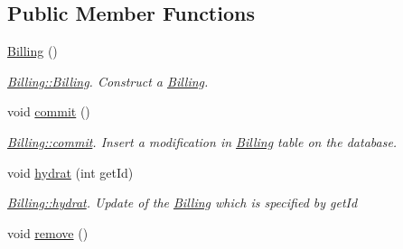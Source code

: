 \subsection*{Public Member Functions}
\begin{DoxyCompactItemize}
\item 
\hypertarget{classBilling_a8e7a38f9ef550c20ce1bf6b46153defa}{\hyperlink{classBilling_a8e7a38f9ef550c20ce1bf6b46153defa}{Billing} ()}\label{classBilling_a8e7a38f9ef550c20ce1bf6b46153defa}

\begin{DoxyCompactList}\small\item\em \hyperlink{classBilling_a8e7a38f9ef550c20ce1bf6b46153defa}{Billing\-::\-Billing}. Construct a \hyperlink{classBilling}{Billing}. \end{DoxyCompactList}\item 
\hypertarget{classBilling_a3d96a6baed6ca2d2e1096496f0fd3270}{void \hyperlink{classBilling_a3d96a6baed6ca2d2e1096496f0fd3270}{commit} ()}\label{classBilling_a3d96a6baed6ca2d2e1096496f0fd3270}

\begin{DoxyCompactList}\small\item\em \hyperlink{classBilling_a3d96a6baed6ca2d2e1096496f0fd3270}{Billing\-::commit}. Insert a modification in \hyperlink{classBilling}{Billing} table on the database. \end{DoxyCompactList}\item 
void \hyperlink{classBilling_a8beb72061cd53a964cf0ba3f04686613}{hydrat} (int get\-Id)
\begin{DoxyCompactList}\small\item\em \hyperlink{classBilling_a8beb72061cd53a964cf0ba3f04686613}{Billing\-::hydrat}. Update of the \hyperlink{classBilling}{Billing} which is specified by {\itshape get\-Id} \end{DoxyCompactList}\item 
\hypertarget{classBilling_ab5efe0286d292707073b9f1cecd98d6f}{void \hyperlink{classBilling_ab5efe0286d292707073b9f1cecd98d6f}{remove} ()}\label{classBilling_ab5efe0286d292707073b9f1cecd98d6f}


\end{DoxyCompactItemize}
